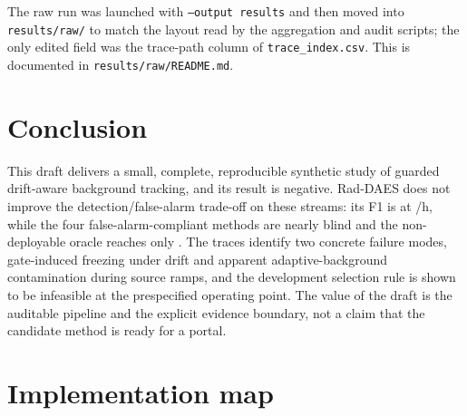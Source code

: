 \documentclass[11pt]{article}
\begin{document}
{\sloppy
The raw run was launched with \texttt{--output results} and then moved into \texttt{results/raw/} to match the layout read by the aggregation and audit scripts; the only edited field was the trace-path column of \texttt{trace\_index.csv}. This is documented in \texttt{results/raw/README.md}.\par}

\section{Conclusion}

This draft delivers a small, complete, reproducible synthetic study of guarded drift-aware background tracking, and its result is negative. Rad-DAES does not improve the detection/false-alarm trade-off on these streams: its F1 is \RadDAESFone{} at \RadDAESFarPerHour{}/h, while the four false-alarm-compliant methods are nearly blind and the non-deployable oracle reaches only \BestValue{}. The traces identify two concrete failure modes, gate-induced freezing under drift and apparent adaptive-background contamination during source ramps, and the development selection rule is shown to be infeasible at the prespecified operating point. The value of the draft is the auditable pipeline and the explicit evidence boundary, not a claim that the candidate method is ready for a portal.




\appendix
\section{Implementation map}
\end{document}
